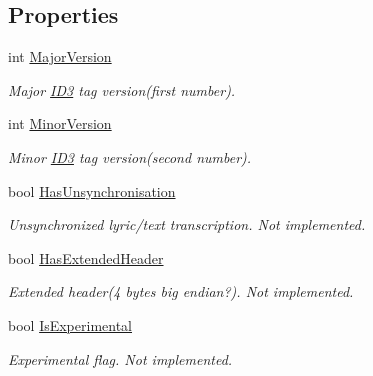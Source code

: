 \subsection*{Properties}
\begin{DoxyCompactItemize}
\item 
int \mbox{\hyperlink{classOSML_1_1Media_1_1Metadata_1_1ID3_1_1ID3V2_aabcdba343eb572c108de63f597085ab6}{Major\+Version}}
\begin{DoxyCompactList}\small\item\em Major \mbox{\hyperlink{namespaceOSML_1_1Media_1_1Metadata_1_1ID3}{I\+D3}} tag version(first number). \end{DoxyCompactList}\item 
int \mbox{\hyperlink{classOSML_1_1Media_1_1Metadata_1_1ID3_1_1ID3V2_a5b8456132639ddeff6e98940d28f108a}{Minor\+Version}}
\begin{DoxyCompactList}\small\item\em Minor \mbox{\hyperlink{namespaceOSML_1_1Media_1_1Metadata_1_1ID3}{I\+D3}} tag version(second number). \end{DoxyCompactList}\item 
bool \mbox{\hyperlink{classOSML_1_1Media_1_1Metadata_1_1ID3_1_1ID3V2_a365e8b79e460a05d485a606faab0e79e}{Has\+Unsynchronisation}}
\begin{DoxyCompactList}\small\item\em Unsynchronized lyric/text transcription. Not implemented. \end{DoxyCompactList}\item 
bool \mbox{\hyperlink{classOSML_1_1Media_1_1Metadata_1_1ID3_1_1ID3V2_a1ca6270002774e034387c83cff22ed15}{Has\+Extended\+Header}}
\begin{DoxyCompactList}\small\item\em Extended header(4 bytes big endian?). Not implemented. \end{DoxyCompactList}\item 
bool \mbox{\hyperlink{classOSML_1_1Media_1_1Metadata_1_1ID3_1_1ID3V2_a917b252f24ebdc47f76a53260c3b7f56}{Is\+Experimental}}
\begin{DoxyCompactList}\small\item\em Experimental flag. Not implemented. \end{DoxyCompactList}\item 

\end{DoxyCompactItemize}
